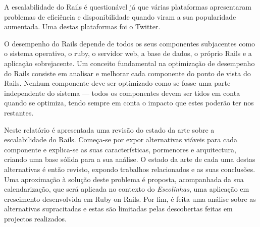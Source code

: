 A escalabilidade do Rails é questionável já que várias plataformas apresentaram problemas de eficiência e disponibilidade quando viram a sua popularidade aumentada. Uma destas plataformas foi o Twitter.

O desempenho do Rails depende de todos os seus componentes subjacentes como o sistema operativo, o ruby, o servidor web, a base de dados, o próprio Rails e a aplicação sobrejacente. Um conceito fundamental na optimização de desempenho do Rails consiste em analisar e melhorar cada componente do ponto de vista do Rails. Nenhum componente deve ser optimizado como se fosse uma parte independente do sistema --- todos os componentes devem ser tidos em conta quando se optimiza, tendo sempre em conta o impacto que estes poderão ter nos restantes.

Neste relatório é apresentada uma revisão do estado da arte sobre a escalabilidade do Rails. Começa-se por expor alternativas viáveis para cada componente e explica-se as suas características, pormenores e arquitectura, criando uma base sólida para a sua análise. O estado da arte de cada uma destas alternativas é então revisto, expondo trabalhos relacionados e as suas conclusões. Uma aproximação à solução deste problema é proposta, acompanhada da sua calendarização, que será aplicada no contexto do \textit{Escolinhas}, uma aplicação em crescimento desenvolvida em Ruby on Rails. Por fim, é feita uma análise sobre as alternativas supracitadas e estas são limitadas pelas descobertas feitas em projectos realizados.
